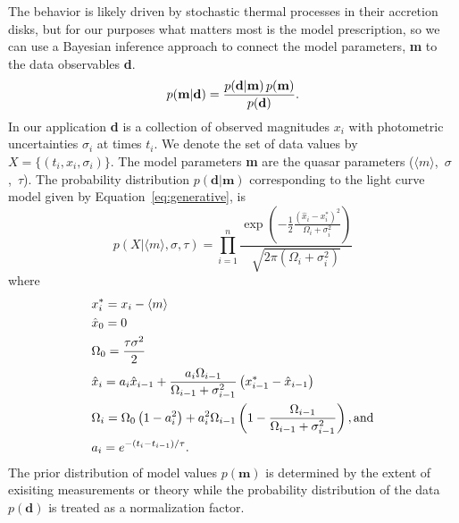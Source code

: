 \documentclass{emulateapj}
\begin{document}

The behavior is likely driven by stochastic thermal processes in their
accretion disks, but for our purposes what matters most is the model
prescription, so we can use a Bayesian inference approach to connect
the model parameters, {\bf m} to the data observables {\bf d}.
\begin{equation}
p({\mathbf m} | {\mathbf d}) = 
{{p({\mathbf d} | {\mathbf m})\, p({\mathbf m})}
\over{p({\mathbf  d})}}. \nonumber 
\end{equation}
In our application {\bf d} is a collection of observed magnitudes
${x_{i}}$ with photometric uncertainties $\sigma_i$ at times
${t_i}$. We denote the set of data values by
$X=\{(t_i,x_i,\sigma_i)\}$. The model parameters {\bf m} are the
quasar parameters ($\langle m\rangle$,~$\sigma$,~$\tau$). The
probability distribution $p({\mathbf d} | {\mathbf m})$ corresponding
to the light curve model given by Equation~\ref{eq:generative},
is 
\begin{equation} 
p(X|\langle m\rangle, \sigma,\tau) =
\prod_{i=1}^{n}
\frac{
\exp\left(-\frac{1}{2}%
\frac{\left(\hat{x}_i-x^{*}_i\right)^2}{\Omega_i+\sigma_i^2} 
\right)
}
{
\sqrt{2\pi\left(\Omega_i+\sigma_i^2\right)}
}
\end{equation}
where 
\begin{alignat}{1}
& x_{i}^{*} = x_i-\langle m \rangle \nonumber\\
& \hat{x}_0 = 0   \nonumber\\
& \Omega_{0}=\frac{\tau\sigma^2}{2} \nonumber\\
& \hat{x}_i = a_i\hat{x}_{i-1} + \frac{a_i\Omega_{i-1}}{\Omega_{i-1}+\sigma^2_{i-1}} \left(x^{*}_{i-1}-\hat{x}_{i-1}\right) \nonumber\\
& \Omega_{i}=\Omega_{0}\left(1-a_{i}^2\right) +
a_{i}^2\Omega_{i-1}\left(1-\frac{\Omega_{i-1}}{\Omega_{i-1}+\sigma_{i-1}^2}\right),
{\rm and} \nonumber\\
& a_i = e^{-\left(t_i-t_{i-1}\right)/\tau}. \nonumber
\end{alignat}
The prior distribution of model values $p(\mathbf{m})$ is determined by the extent of exisiting measurements or theory while the probability distribution of the data $p(\mathbf{d})$ is treated as a normalization factor.
\end{document}
